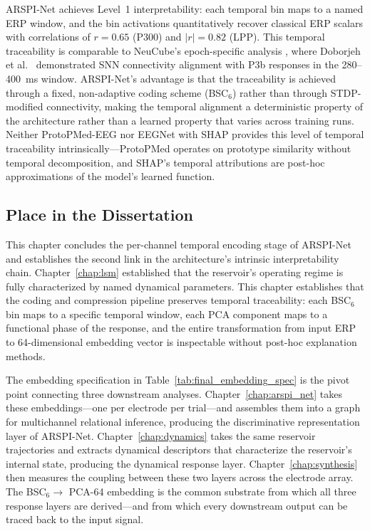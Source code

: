 ARSPI-Net achieves Level~1 interpretability: each temporal bin maps to a named ERP window, and the bin activations quantitatively recover classical ERP scalars with correlations of $r = 0.65$ (P300) and $|r| = 0.82$ (LPP). This temporal traceability is comparable to NeuCube's epoch-specific analysis \cite{kasabov_neucube_2014}, where Doborjeh et al.\ \cite{doborjeh_explainable_2021} demonstrated SNN connectivity alignment with P3b responses in the 280--400~ms window. ARSPI-Net's advantage is that the traceability is achieved through a fixed, non-adaptive coding scheme (BSC$_6$) rather than through STDP-modified connectivity, making the temporal alignment a deterministic property of the architecture rather than a learned property that varies across training runs. Neither ProtoPMed-EEG \cite{barnett_protopmed_2024} nor EEGNet with SHAP provides this level of temporal traceability intrinsically---ProtoPMed operates on prototype similarity without temporal decomposition, and SHAP's temporal attributions are post-hoc approximations of the model's learned function.

\subsection{Place in the Dissertation}

This chapter concludes the per-channel temporal encoding stage of ARSPI-Net and establishes the second link in the architecture's intrinsic interpretability chain. Chapter~\ref{chap:lsm} established that the reservoir's operating regime is fully characterized by named dynamical parameters. This chapter establishes that the coding and compression pipeline preserves temporal traceability: each BSC$_6$ bin maps to a specific temporal window, each PCA component maps to a functional phase of the response, and the entire transformation from input ERP to 64-dimensional embedding vector is inspectable without post-hoc explanation methods.

The embedding specification in Table~\ref{tab:final_embedding_spec} is the pivot point connecting three downstream analyses. Chapter~\ref{chap:arspi_net} takes these embeddings---one per electrode per trial---and assembles them into a graph for multichannel relational inference, producing the discriminative representation layer of ARSPI-Net. Chapter~\ref{chap:dynamics} takes the same reservoir trajectories and extracts dynamical descriptors that characterize the reservoir's internal state, producing the dynamical response layer. Chapter~\ref{chap:synthesis} then measures the coupling between these two layers across the electrode array. The BSC$_6 \to$ PCA-64 embedding is the common substrate from which all three response layers are derived---and from which every downstream output can be traced back to the input signal.